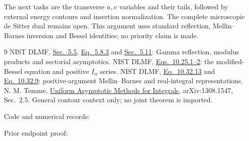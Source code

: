 \documentclass[11pt,a4paper]{article}
\begin{document}
The next tasks are the transverse \(u,v\) variables and their tails,
followed by external energy contours and insertion normalization.
The complete microscopic de Sitter dual remains open.
This argument uses standard reflection, Mellin--Barnes inversion
and Bessel identities; no priority claim is made.

\begin{thebibliography}{9}
 NIST DLMF,
\href{https://dlmf.nist.gov/5.5}{Sec.\ 5.5},
\href{https://dlmf.nist.gov/5.8.E3}{Eq.\ 5.8.3} and
\href{https://dlmf.nist.gov/5.11}{Sec.\ 5.11}:
Gamma reflection, modulus products and sectorial asymptotics.
 NIST DLMF,
\href{https://dlmf.nist.gov/10.25}{Eqs.\ 10.25.1--2}:
the modified-Bessel equation and positive \(I_\alpha\) series.
 NIST DLMF,
\href{https://dlmf.nist.gov/10.32.E13}{Eq.\ 10.32.13}
and \href{https://dlmf.nist.gov/10.32.E9}{Eq.\ 10.32.9}:
positive-argument Mellin--Barnes and real-integral representations.
 N. M. Temme,
\href{https://arxiv.org/abs/1308.1547}{Uniform Asymptotic Methods
for Integrals}, arXiv:1308.1547, Sec.\ 2.5.
General contour context only; no joint theorem is imported.
\end{thebibliography}
{\small\noindent Code and numerical records:\par
\noindent{}\par
\noindent{}\par
\noindent Prior endpoint proof:\par
\noindent{}\par}
\end{document}
